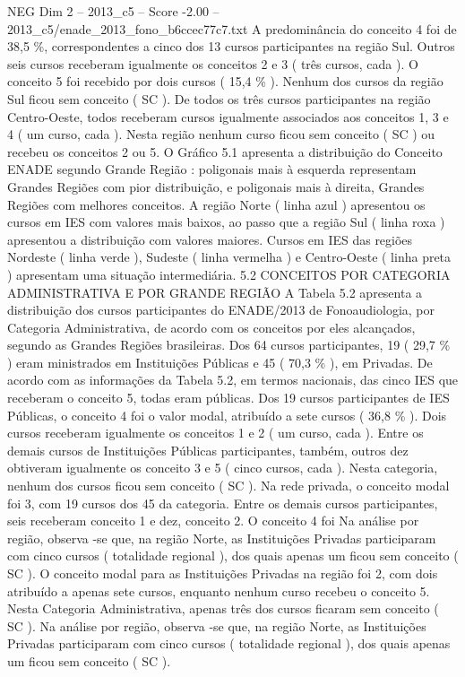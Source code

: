 \begin{textsample}{NEG Dim 2 – 2013\_c5 – Score -2.00 – 2013\_c5/enade\_2013\_fono\_b6ccec77c7.txt}
A predominância do conceito 4 foi de 38,5 \%, correspondentes a cinco dos 13 cursos participantes na região Sul.
Outros seis cursos receberam igualmente os conceitos 2 e 3 ( três cursos, cada ).
O conceito 5 foi recebido por dois cursos ( 15,4 \% ).
Nenhum dos cursos da região Sul ficou sem conceito ( SC ).
De todos os três cursos participantes na região Centro-Oeste, todos receberam cursos igualmente associados aos conceitos 1, 3 e 4 ( um curso, cada ).
Nesta região nenhum curso ficou sem conceito ( SC ) ou recebeu os conceitos 2 ou 5.
O Gráfico 5.1 apresenta a distribuição do Conceito ENADE segundo Grande Região : poligonais mais à esquerda representam Grandes Regiões com pior distribuição, e poligonais mais à direita, Grandes Regiões com melhores conceitos.
A região Norte ( linha azul ) apresentou os cursos em IES com valores mais baixos, ao passo que a região Sul ( linha roxa ) apresentou a distribuição com valores maiores.
Cursos em IES das regiões Nordeste ( linha verde ), Sudeste ( linha vermelha ) e Centro-Oeste ( linha preta ) apresentam uma situação intermediária. 5.2 CONCEITOS POR CATEGORIA ADMINISTRATIVA E POR GRANDE REGIÃO A Tabela 5.2 apresenta a distribuição dos cursos participantes do ENADE/2013 de Fonoaudiologia, por Categoria Administrativa, de acordo com os conceitos por eles alcançados, segundo as Grandes Regiões brasileiras.
Dos 64 cursos participantes, 19 ( 29,7 \% ) eram ministrados em Instituições Públicas e 45 ( 70,3 \% ), em Privadas.
De acordo com as informações da Tabela 5.2, em termos nacionais, das cinco IES que receberam o conceito 5, todas eram públicas.
Dos 19 cursos participantes de IES Públicas, o conceito 4 foi o valor modal, atribuído a sete cursos ( 36,8 \% ).
Dois cursos receberam igualmente os conceitos 1 e 2 ( um curso, cada ).
Entre os demais cursos de Instituições Públicas participantes, também, outros dez obtiveram igualmente os conceito 3 e 5 ( cinco cursos, cada ).
Nesta categoria, nenhum dos cursos ficou sem conceito ( SC ).
Na rede privada, o conceito modal foi 3, com 19 cursos dos 45 da categoria.
Entre os demais cursos participantes, seis receberam conceito 1 e dez, conceito 2.
O conceito 4 foi Na análise por região, observa -se que, na região Norte, as Instituições Privadas participaram com cinco cursos ( totalidade regional ), dos quais apenas um ficou sem conceito ( SC ).
O conceito modal para as Instituições Privadas na região foi 2, com dois atribuído a apenas sete cursos, enquanto nenhum curso recebeu o conceito 5.
Nesta Categoria Administrativa, apenas três dos cursos ficaram sem conceito ( SC ).
Na análise por região, observa -se que, na região Norte, as Instituições Privadas participaram com cinco cursos ( totalidade regional ), dos quais apenas um ficou sem conceito ( SC ).

\end{textsample}
